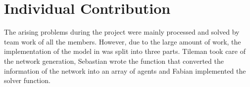 
\section{Individual Contribution}
\label{sec:individualContrib}

The arising problems during the project were mainly processed and solved by
team work of all the members.  However, due to the large amount of work, the
implementation of the model in \matlab was split into three parts.  Tileman
took care of the network generation, Sebastian wrote the function that
converted the information of the network into an array of agents and Fabian
implemented the solver function.

